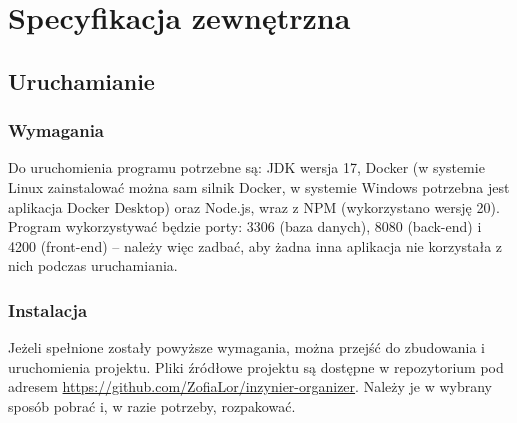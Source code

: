 \documentclass[a4paper,twoside,12pt]{book}
\begin{document}
\chapter{Specyfikacja zewnętrzna}
\label{ch:04}


\section{Uruchamianie}

\subsection{Wymagania}
Do uruchomienia programu potrzebne są: JDK wersja 17, Docker (w systemie Linux zainstalować można sam silnik Docker, w systemie Windows potrzebna jest aplikacja Docker Desktop) oraz Node.js, wraz z NPM (wykorzystano wersję 20). Program wykorzystywać będzie porty: 3306 (baza danych), 8080 (back-end) i 4200 (front-end) -- należy więc zadbać, aby żadna inna aplikacja nie korzystała z nich podczas uruchamiania.

\subsection{Instalacja}

Jeżeli spełnione zostały powyższe wymagania, można przejść do zbudowania i uruchomienia projektu. Pliki źródłowe projektu są dostępne w repozytorium pod adresem \url{https://github.com/ZofiaLor/inzynier-organizer}. Należy je w wybrany sposób pobrać i, w razie potrzeby, rozpakować.
\end{document}
